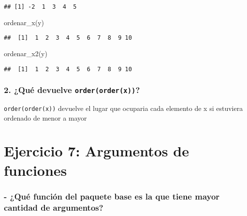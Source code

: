 \documentclass[
]{article}
\newenvironment{Shaded}{\begin{snugshade}}{\end{snugshade}}
\newcommand{\FunctionTok}[1]{\textcolor[rgb]{0.00,0.00,0.00}{#1}}
\newcommand{\NormalTok}[1]{#1}
\begin{document}
\begin{verbatim}
## [1] -2  1  3  4  5
\end{verbatim}

\begin{Shaded}
\begin{Highlighting}[]
\FunctionTok{ordenar\_x}\NormalTok{(y)}
\end{Highlighting}
\end{Shaded}

\begin{verbatim}
##  [1]  1  2  3  4  5  6  7  8  9 10
\end{verbatim}

\begin{Shaded}
\begin{Highlighting}[]
\FunctionTok{ordenar\_x2}\NormalTok{(y)}
\end{Highlighting}
\end{Shaded}

\begin{verbatim}
##  [1]  1  2  3  4  5  6  7  8  9 10
\end{verbatim}

\hypertarget{quuxe9-devuelve-orderorderx}{%
\subsubsection{\texorpdfstring{2. ¿Qué devuelve
\texttt{order(order(x))}?}{2. ¿Qué devuelve order(order(x))?}}\label{quuxe9-devuelve-orderorderx}}

\texttt{order(order(x))} devuelve el lugar que ocuparia cada elemento de
x si estuviera ordenado de menor a mayor

\newpage

\hypertarget{ejercicio-7-argumentos-de-funciones}{%
\section{Ejercicio 7: Argumentos de
funciones}\label{ejercicio-7-argumentos-de-funciones}}

\hypertarget{quuxe9-funciuxf3n-del-paquete-base-es-la-que-tiene-mayor-cantidad-de-argumentos}{%
\subsubsection{- ¿Qué función del paquete base es la que tiene mayor
cantidad de
argumentos?}\label{quuxe9-funciuxf3n-del-paquete-base-es-la-que-tiene-mayor-cantidad-de-argumentos}}
\end{document}
